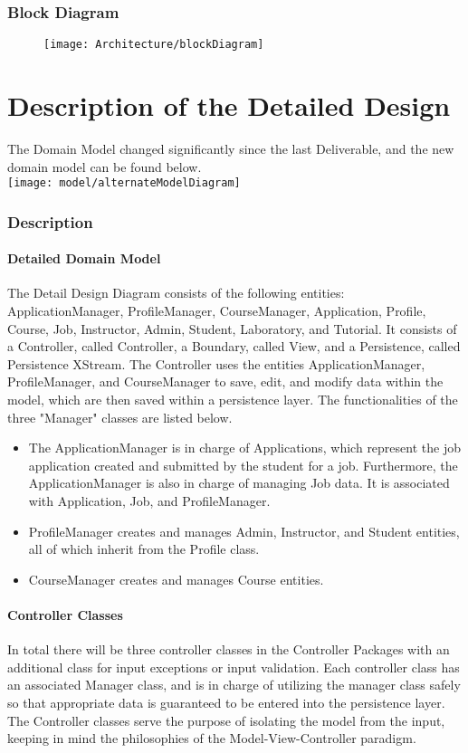 \documentclass[12pt]{report}
\begin{document}
\section{Block Diagram}
\begin{figure}[h]
	\texttt{[image: Architecture/blockDiagram]}
\end{figure}
%

\part{Description of the Detailed Design}
The Domain Model changed significantly since the last Deliverable, and the new domain model can be
found below.\\
\texttt{[image: model/alternateModelDiagram]}
\section{Description}
\subsection{Detailed Domain Model}
The Detail Design Diagram consists of the following entities: ApplicationManager, ProfileManager,
CourseManager, Application, Profile, Course, Job, Instructor, Admin, Student, Laboratory, and
Tutorial. It consists of a Controller, called Controller, a Boundary, called View, and a
Persistence, called Persistence XStream. The Controller uses the entities ApplicationManager,
ProfileManager, and CourseManager to save, edit, and modify data within the model, which are then
saved within a persistence layer. The functionalities of the three "Manager" classes are listed
below.
\begin{itemize}
	\item The ApplicationManager is in charge of Applications, which represent the job application
		created and submitted
		by the student for a job. Furthermore, the ApplicationManager is also in charge of managing
		Job data. It is associated with Application, Job, and ProfileManager.
	\item ProfileManager creates and manages Admin, Instructor, and Student entities, all of which inherit from
		the Profile class.
	\item CourseManager creates and manages Course entities.
\end{itemize}
\subsection{Controller Classes}
In total there will be three controller classes in the Controller Packages with an additional class
for input exceptions or input validation. Each controller class has an associated Manager class, and
is in charge of utilizing the manager class safely so that appropriate data is guaranteed to be
entered into the persistence layer.\\
The Controller classes serve the purpose of isolating the model from the input, keeping in mind the
philosophies of the Model-View-Controller paradigm.
\end{document}

